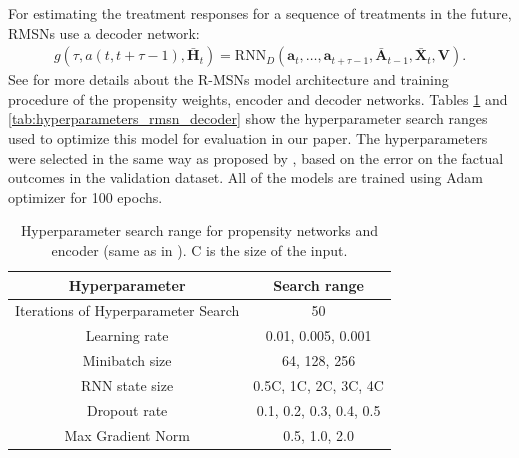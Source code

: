 \documentclass{article} %
\newcommand{\vc}[1]{\mathbf{#1}}
\newcommand{\hist}[1]{\bar{\vc{#1}}}
\begin{document}
	For estimating the treatment responses for a sequence of treatments in the future, RMSNs use a decoder network:
	\begin{eqnarray}
	g(\tau, a(t, t + \tau - 1), \hist{H}_t) =  \text{RNN}_{D}(\vc{a}_t, \dots, \vc{a}_{t+\tau-1}, \hist{A}_{t-1}, \hist{X}_{t}, \vc{V}). 
	\end{eqnarray}
	See \cite{lim2018forecasting} for more details about the R-MSNs model architecture and training procedure of the propensity weights, encoder and decoder networks. Tables \ref{tab:hyperparameters_rmsn_propensity_encodeer} and \ref{tab:hyperparameters_rmsn_decoder} show the hyperparameter search ranges used to optimize this model for evaluation in our paper. The hyperparameters were selected in the same way as proposed by \cite{lim2018forecasting}, based on the error on the factual outcomes in the validation dataset. All of the models are trained using Adam optimizer for 100 epochs.  
	
	\begin{table}[ht]
		 	\caption{Hyperparameter search range for propensity networks and encoder (same as in \cite{lim2018forecasting}). C is the size of the input. }
		 	\label{tab:hyperparameters_rmsn_propensity_encodeer}
		 	\vskip 0.15in
		 	\begin{center}
		 		\begin{small}
		 			\begin{tabular}{cc}
		 				\toprule
		 				Hyperparameter & Search range \\
		 				\hline
		 				\hline
		 				Iterations of Hyperparameter Search & 50 \\
		 				Learning rate &    0.01, 0.005, 0.001  \\
		 				Minibatch size &  64, 128, 256  \\
		 				RNN state size &  0.5C, 1C, 2C, 3C, 4C   \\
		 				Dropout rate &  0.1, 0.2, 0.3, 0.4, 0.5 \\
		 				Max Gradient Norm & 0.5, 1.0, 2.0 \\
		 				\bottomrule
		 			\end{tabular}
		 		\end{small}
		 	\end{center}
		 	\vskip -0.1in
		 \end{table}
 
\end{document}
